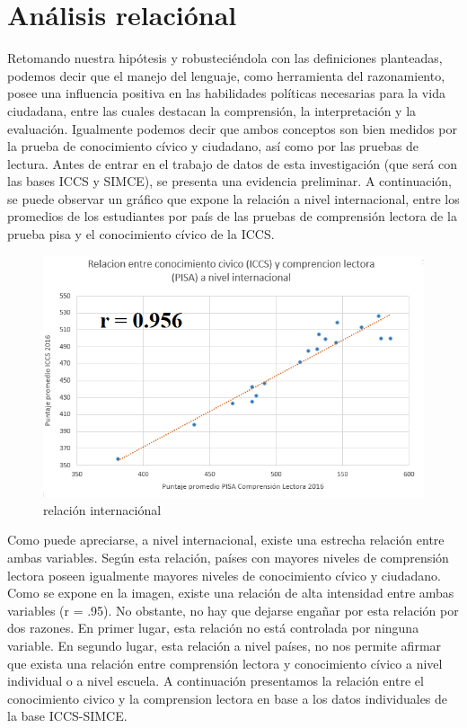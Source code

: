 \documentclass[12pt,twoside]{templates/facsothesis}
\begin{document}
\newpage

\hypertarget{anuxe1lisis-relaciuxf3nal}{%
\section{Análisis relaciónal}\label{anuxe1lisis-relaciuxf3nal}}

Retomando nuestra hipótesis y robusteciéndola con las definiciones planteadas, podemos decir que el manejo del lenguaje, como herramienta del razonamiento, posee una influencia positiva en las habilidades políticas necesarias para la vida ciudadana, entre las cuales destacan la comprensión, la interpretación y la evaluación. Igualmente podemos decir que ambos conceptos son bien medidos por la prueba de conocimiento cívico y ciudadano, así como por las pruebas de lectura. Antes de entrar en el trabajo de datos de esta investigación (que será con las bases ICCS y SIMCE), se presenta una evidencia preliminar. A continuación, se puede observar un gráfico que expone la relación a nivel internacional, entre los promedios de los estudiantes por país de las pruebas de comprensión lectora de la prueba pisa y el conocimiento cívico de la ICCS.

\begin{figure}

{\centering \includegraphics[width=1\linewidth]{images/relacionmacro} 

}

\caption{relación internaciónal}\label{fig:unnamed-chunk-8}
\end{figure}

Como puede apreciarse, a nivel internacional, existe una estrecha relación entre ambas variables. Según esta relación, países con mayores niveles de comprensión lectora poseen igualmente mayores niveles de conocimiento cívico y ciudadano. Como se expone en la imagen, existe una relación de alta intensidad entre ambas variables (r = .95). No obstante, no hay que dejarse engañar por esta relación por dos razones. En primer lugar, esta relación no está controlada por ninguna variable. En segundo lugar, esta relación a nivel países, no nos permite afirmar que exista una relación entre comprensión lectora y conocimiento cívico a nivel individual o a nivel escuela. A continuación presentamos la relación entre el conocimiento civico y la comprension lectora en base a los datos individuales de la base ICCS-SIMCE.
\end{document}
